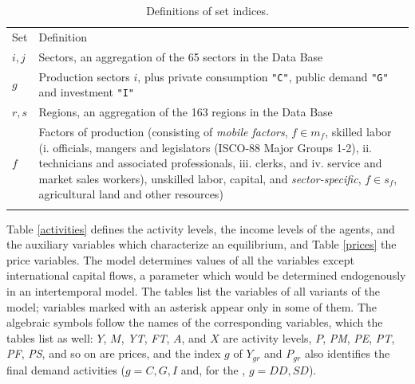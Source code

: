 \renewcommand{\arraystretch}{1}
\renewcommand{\tabcolsep}{1mm}
\begin{table}[t!]
\begin{center}
\caption{Definitions of set indices.} \label{sets}
\small
\begin{tabular}{lp{4in}}
\toprule
Set &Definition  \\
\addlinespace
\midrule
\addlinespace
$i,j$ & Sectors, an aggregation of the 65 sectors in the \GTAP 12
Data Base \\
$g$ & Production sectors $i$, plus private consumption \texttt{"C"},
public demand \texttt{"G"} and investment \texttt{"I"} \\
$r,s$ & Regions, an aggregation of the 163 regions in the
\GTAP 12 Data Base\\
$f$ & Factors of production (consisting of
\textit{mobile factors}, $f \in m_f$, skilled labor (i. officials,
mangers and legislators (ISCO-88 Major Groups 1-2), ii. technicians
and associated professionals, iii.
clerks, and iv. service and market sales workers), unskilled labor,
capital, and \textit{sector-specific}, $f \in s_f$, agricultural land
and other resources)\\ \addlinespace \bottomrule
\end{tabular}
\end{center}
\vspace{0.4in}
\end{table}

Table \ref{activities} defines the activity levels, the income levels of
the agents, and the auxiliary variables which characterize an
equilibrium, and Table \ref{prices} the price variables. The model
determines values of all the variables except international capital
flows, a parameter which would be determined endogenously in an
intertemporal model. The tables list the variables of all variants of
the model; variables marked with an asterisk appear only in some of
them. The algebraic symbols follow the names of the corresponding \GAMS
variables, which the tables list as well: $Y$, $M$, \textit{YT},
\textit{FT}, $A$, and $X$ are activity levels, $P$, \textit{PM},
\textit{PE}, \textit{PT}, \textit{PF}, \textit{PS}, and so on are
prices, and the index $g$ of $Y_{gr}$ and $P_{gr}$ also identifies the
final demand activities ($g=C,G,I$ and, for the \LES, $g=\textit{DD},\textit{SD}$).

